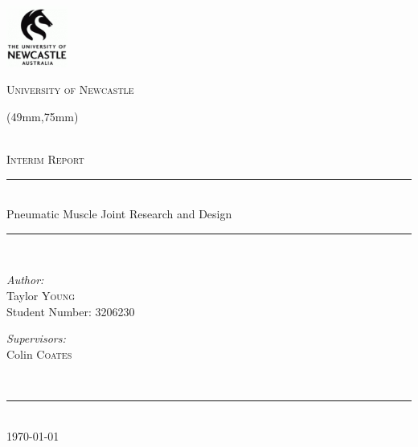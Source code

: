 \begin{titlepage}
    \begin{center}
        \begin{center}
            \includegraphics[width=0.15\textwidth]{./figures/uon_logo.png}
            
            \textsc{\LARGE University of Newcastle}\\[1cm]
        \end{center}
        
        \begin{textblock*}{133mm}(49mm,75mm)  %
            \begin{minipage}[t][65mm][t]{133mm}
                \centering
                ~\\[0.5cm]
                \textsc{\Large Interim Report}\\[0.5cm]
            
                \hrule ~\\[0.5cm]
                { \Large Pneumatic Muscle Joint Research and Design\\[0.5cm] }
                \hrule ~\\[0.5cm]
            
                \noindent
                \begin{minipage}{0.4\textwidth}
                    \begin{flushleft} \large
                        \emph{Author:}\\
                        Taylor \textsc{Young}\\
                        Student Number: 3206230
                    \end{flushleft}
                \end{minipage}%
                \begin{minipage}{0.4\textwidth}
                    \begin{flushright} \large
                        \emph{Supervisors:} \\
                        Colin \textsc{Coates}\\
                    \end{flushright}
                \end{minipage}\\[0.5cm]
                \hrule ~\\[0.3cm]
                {\large \today}
            \end{minipage}
        \end{textblock*}
    \end{center}
    

\end{titlepage}
